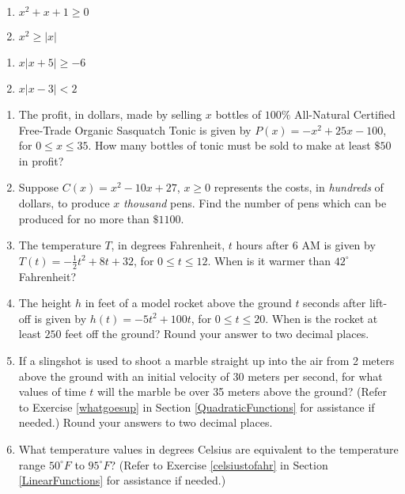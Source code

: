 \begin{multicols}{2}
\begin{enumerate}
\setcounter{enumi}{\value{HW}}

\item $x^{2} + x + 1 \geq 0$
\item  $x^2 \geq |x|$ 

\setcounter{HW}{\value{enumi}}
\end{enumerate}
\end{multicols}

\begin{multicols}{2}
\begin{enumerate}
\setcounter{enumi}{\value{HW}}

\item  $x |x+5| \geq -6$  
\item  $x |x-3| < 2$   \label{solveinequabsquadlast}

\setcounter{HW}{\value{enumi}}
\end{enumerate}
\end{multicols}


\begin{enumerate}
\setcounter{enumi}{\value{HW}}

\item  The profit, in dollars, made by selling $x$ bottles of $100 \%$ All-Natural Certified Free-Trade Organic Sasquatch Tonic is given by $P(x) = -x^2+25x-100$, for $0 \leq x \leq 35$.  How many bottles of tonic must be sold to make at least $\$50$ in profit?

\item  Suppose $C(x) = x^2-10x+27$, $x \geq 0$ represents the costs, in \textit{hundreds} of dollars, to produce $x$ \textit{thousand} pens.  Find the number of pens which can be produced for no more than $\$1100$.

\item The temperature $T$, in degrees Fahrenheit, $t$ hours after 6 AM is given by $T(t) = -\frac{1}{2} t^2 + 8t+32$, for $0 \leq t \leq 12$.  When is it warmer than $42^{\circ}$ Fahrenheit?

\item  The height $h$ in feet of a model rocket above the ground $t$ seconds after lift-off is given by $h(t) = -5t^2+100t$, for $0 \leq t \leq 20$. When is the rocket at least $250$ feet off the ground? Round your answer to two decimal places.

\item If a slingshot is used to shoot a marble straight up into the air from 2 meters above the ground with an initial velocity of 30 meters per second, for what values of time $t$ will the marble be over 35 meters above the ground? (Refer to Exercise \ref{whatgoesup} in Section \ref{QuadraticFunctions} for assistance if needed.)  Round your answers to two decimal places.

\item What temperature values in degrees Celsius are equivalent to the temperature range $50^{\circ}F$ to $95^{\circ}F$?  (Refer to Exercise \ref{celsiustofahr} in Section \ref{LinearFunctions} for assistance if needed.) 

\setcounter{HW}{\value{enumi}}
\end{enumerate}

